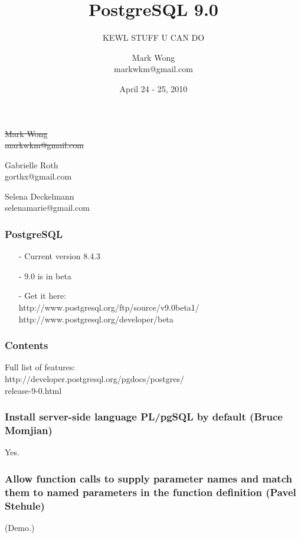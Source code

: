 \documentclass{beamer}
\title{PostgreSQL 9.0}
\subtitle{KEWL STUFF U CAN DO}
\author{Mark Wong\\markwkm@gmail.com}
\institute{LinuxFest Northwest 2010}
\date{April 24 - 25, 2010}
\begin{document}
\frame{\titlepage}

\frame
{
    \begin{center}
    \sout{Mark Wong\\markwkm@gmail.com}

    \mbox{}

    Gabrielle Roth\\gorthx@gmail.com

    \mbox{}

    Selena Deckelmann\\selenamarie@gmail.com
    \end{center}
}

\frame
{
  \frametitle{PostgreSQL}

  \begin{itemize}
  \item[-] Current version 8.4.3
  \item[-] 9.0 is in beta
  \item[-] Get it here:\\
  http://www.postgresql.org/ftp/source/v9.0beta1/\\
  http://www.postgresql.org/developer/beta
  \end{itemize}
}

\frame
{
  \frametitle{Contents}

  Full list of features:\\
  http://developer.postgresql.org/pgdocs/postgres/\\
  release-9-0.html
}

\frame
{
  \frametitle{Install server-side language PL/pgSQL by default (Bruce Momjian)}
  \begin{center}
  Yes.
  \end{center}
}

\frame
{
  \frametitle{Allow function calls to supply parameter names and match them to named parameters in the function definition (Pavel Stehule)}

(Demo.)
}

\end{document}

